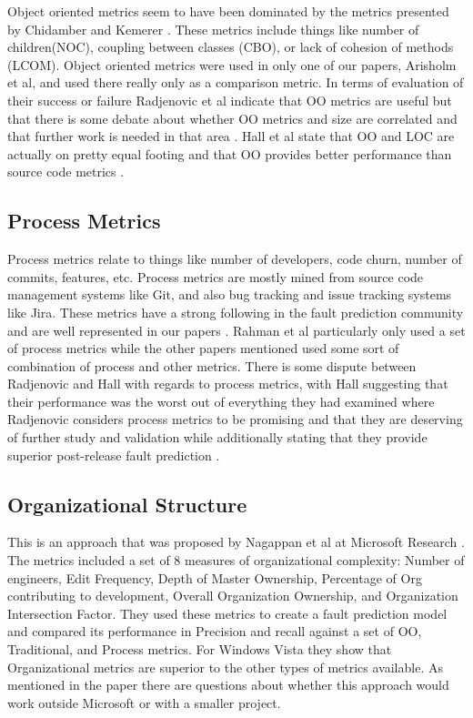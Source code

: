 \documentclass{sig-alternate-05-2015}
\begin{document}
Object oriented metrics seem to have been dominated by the metrics presented by Chidamber and Kemerer \cite{Chidamber} \cite{DAmbros}.  These metrics include things like number of children(NOC), coupling between classes (CBO), or lack of cohesion of methods (LCOM).    Object oriented metrics were used in only one of our papers, Arisholm et al, and used there really only as a comparison metric\cite{Arisholm}.  In terms of evaluation of their success or failure Radjenovic et al indicate that OO metrics are useful but that there is some debate about whether OO metrics and size are correlated and that further work is needed in that area  \cite{Radjenovic}.  Hall et al state that OO and LOC are actually on pretty equal footing and that OO provides better performance than source code metrics \cite{Hall}.

\subsection{Process Metrics}

Process metrics relate to things like number of developers, code churn, number of commits, features, etc.  Process metrics are mostly mined from source code management systems like Git, and also bug tracking and issue tracking systems like Jira.   These metrics have a strong following in the fault prediction community and are well represented in our papers \cite{Posnett} \cite{Bird} \cite{Arisholm} \cite{Rahman}.  Rahman et al particularly only used a set of process metrics while the other papers mentioned used some sort of combination of process and other metrics.  There is some dispute between Radjenovic and Hall with regards to process metrics, with Hall suggesting that their performance was the worst out of everything they had examined where Radjenovic considers process metrics to be promising and that they are deserving of further study and validation while additionally stating that they provide superior post-release fault prediction \cite{Hall} \cite{Radjenovic}.  

\subsection{Organizational Structure}
This is an approach that was proposed by Nagappan et al at Microsoft Research \cite{Nagappan}.  The metrics included a set of 8 measures of organizational complexity: Number of engineers, Edit Frequency, Depth of Master Ownership, Percentage of Org contributing to development, Overall Organization Ownership, and Organization Intersection Factor.  They used these metrics to create a fault prediction model and compared its performance in Precision and recall against a set of OO, Traditional, and Process metrics.  For Windows Vista they show that Organizational metrics are superior to the other types of metrics available.  As mentioned in the paper there are questions about whether this approach would work outside Microsoft or with a smaller project.  
\end{document}
